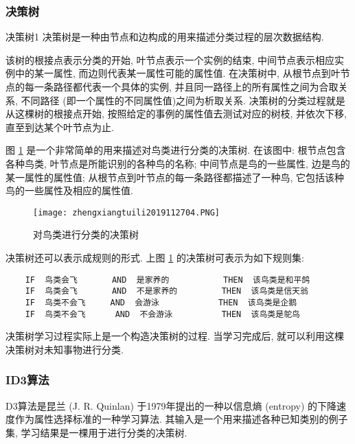 \subsubsection{决策树}
\begin{mydef}{决策树}{1}
    决策树是一种由节点和边构成的用来描述分类过程的层次数据结构.
\end{mydef}

该树的根接点表示分类的开始, 叶节点表示一个实例的结束, 中间节点表示相应实例中的某一属性, 而边则代表某一属性可能的属性值.
在决策树中, 从根节点到叶节点的每一条路径都代表一个具体的实例, 并且同一路径上的所有属性之间为合取关系, 不同路径 (即一个属性的不同属性值)之间为析取关系.
决策树的分类过程就是从这棵树的根接点开始, 按照给定的事例的属性值去测试对应的树枝, 并依次下移, 直至到达某个叶节点为止.

图 \ref{AI32fig2704} 是一个非常简单的用来描述对鸟类进行分类的决策树.
在该图中: 根节点包含各种鸟类, 叶节点是所能识别的各种鸟的名称;
中间节点是鸟的一些属性, 边是鸟的某一属性的属性值;
从根节点到叶节点的每一条路径都描述了一种鸟, 它包括该种鸟的一些属性及相应的属性值.
\begin{figure}[H]
\centering
\texttt{[image: zhengxiangtuili2019112704.PNG]}
\caption{对鸟类进行分类的决策树}
\label{AI32fig2704}
\end{figure}
 决策树还可以表示成规则的形式. 上图 \ref{AI32fig2704} 的决策树可表示为如下规则集:
\begin{Verbatim}
    IF  鸟类会飞       AND  是家养的           THEN  该鸟类是和平鸽
    IF  鸟类会飞       AND  不是家养的         THEN  该鸟类是信天翁
    IF  鸟类不会飞     AND  会游泳            THEN  该鸟类是企鹅
    IF  鸟类不会飞      AND  不会游泳          THEN  该鸟类是鸵鸟
\end{Verbatim}

决策树学习过程实际上是一个构造决策树的过程. 当学习完成后, 就可以利用这棵决策树对未知事物进行分类.
\subsubsection{ID3算法}
D3算法是昆兰  (J. R. Quinlan) 于1979年提出的一种以信息熵  (entropy) 的下降速度作为属性选择标准的一种学习算法.
其输入是一个用来描述各种已知类别的例子集, 学习结果是一棵用于进行分类的决策树.

